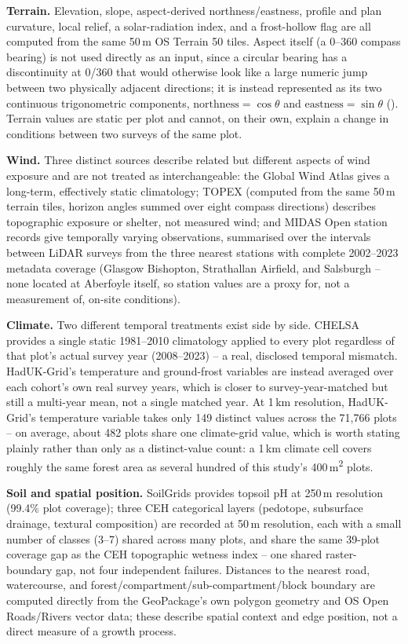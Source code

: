 \textbf{Terrain.} Elevation, slope, aspect-derived northness/eastness, profile and plan curvature,
local relief, a solar-radiation index, and a frost-hollow flag are all computed from the same
50\,m OS Terrain 50 tiles. Aspect itself (a 0--360\textdegree{} compass bearing) is not used
directly as an input, since a circular bearing has a discontinuity at 0\textdegree/360\textdegree{}
that would otherwise look like a large numeric jump between two physically adjacent directions; it
is instead represented as its two continuous trigonometric components,
$\mathrm{northness}=\cos\theta$ and $\mathrm{eastness}=\sin\theta$ (). Terrain values are static per plot and cannot, on their own, explain a change in
conditions between two surveys of the same plot.

\textbf{Wind.} Three distinct sources describe related but different aspects of wind exposure and
are not treated as interchangeable: the Global Wind Atlas gives a long-term, effectively static
climatology; TOPEX (computed from the same 50\,m terrain tiles, horizon angles summed over eight
compass directions) describes topographic exposure or shelter, not measured wind; and MIDAS Open
station records give temporally varying observations, summarised over the intervals between LiDAR
surveys from the three nearest stations with complete 2002--2023 metadata coverage (Glasgow
Bishopton, Strathallan Airfield, and Salsburgh -- none located at Aberfoyle itself, so station
values are a proxy for, not a measurement of, on-site conditions).

\textbf{Climate.} Two different temporal treatments exist side by side. CHELSA provides a single
static 1981--2010 climatology applied to every plot regardless of that plot's actual survey year
(2008--2023) -- a real, disclosed temporal mismatch. HadUK-Grid's temperature and ground-frost
variables are instead averaged over each cohort's own real survey years, which is closer to
survey-year-matched but still a multi-year mean, not a single matched year. At 1\,km resolution,
HadUK-Grid's temperature variable takes only 149 distinct values across the 71,766 plots -- on
average, about 482 plots share one climate-grid value, which is worth stating plainly rather than
only as a distinct-value count: a 1\,km climate cell covers roughly the same forest area as
several hundred of this study's 400\,m\textsuperscript{2} plots.

\textbf{Soil and spatial position.} SoilGrids provides topsoil pH at 250\,m resolution
(99.4\% plot coverage); three CEH categorical layers (pedotope, subsurface drainage, textural
composition) are recorded at 50\,m resolution, each with a small number of classes (3--7) shared
across many plots, and share the same 39-plot coverage gap as the CEH topographic wetness index --
one shared raster-boundary gap, not four independent failures. Distances to the nearest road,
watercourse, and forest/compartment/sub-compartment/block boundary are computed directly from the
GeoPackage's own polygon geometry and OS Open Roads/Rivers vector data; these describe spatial
context and edge position, not a direct measure of a growth process.

